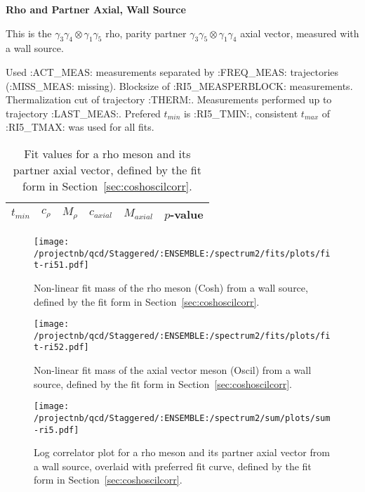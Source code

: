 \clearpage

\centerline{\textbf{Rho and Partner Axial, Wall Source}}

This is the $\gamma_3 \gamma_4 \otimes \gamma_1 \gamma_5$ rho, parity partner $\gamma_3 \gamma_5 \otimes \gamma_1 \gamma_4$ axial vector, measured with a wall source. 

{\small{Used :ACT_MEAS: measurements separated by :FREQ_MEAS: trajectories (:MISS_MEAS: missing). Blocksize of :RI5_MEASPERBLOCK: measurements. Thermalization cut of trajectory :THERM:. Measurements performed up to trajectory :LAST_MEAS:. Prefered $t_{min}$ is :RI5_TMIN:, consistent $t_{max}$ of :RI5_TMAX: was used for all fits.}}


\begin{table}[ht!]
\centering
\scriptsize
\begin{tabular}{|c|c|c|c|c|c|}
\hline
 $t_{min}$ & $c_{\rho}$ &  $M_{\rho}$ & $c_{axial}$ & $M_{axial}$ & $p$-value \\
\hline

\end{tabular}
\caption{Fit values for a rho meson and its partner axial vector, defined by the fit form in Section~\ref{sec:coshoscilcorr}.}
\end{table}

\begin{multicols}{2}
\begin{figure}[H]
\centering
\texttt{[image: /projectnb/qcd/Staggered/:ENSEMBLE:/spectrum2/fits/plots/fit-ri51.pdf]}
\caption{Non-linear fit mass of the rho meson (Cosh) from a wall source, defined by the fit form in Section~\ref{sec:coshoscilcorr}.}
\end{figure}
\columnbreak
\begin{figure}[H]
\centering
\texttt{[image: /projectnb/qcd/Staggered/:ENSEMBLE:/spectrum2/fits/plots/fit-ri52.pdf]}
\caption{Non-linear fit mass of the axial vector meson (Oscil) from a wall source, defined by the fit form in Section~\ref{sec:coshoscilcorr}.}
\end{figure}
\end{multicols}


\begin{figure}[H]
\centering
\texttt{[image: /projectnb/qcd/Staggered/:ENSEMBLE:/spectrum2/sum/plots/sum-ri5.pdf]}
\caption{Log correlator plot for a rho meson and its partner axial vector from a wall source, overlaid with preferred fit curve, defined by the fit form in Section~\ref{sec:coshoscilcorr}.}
\end{figure}

